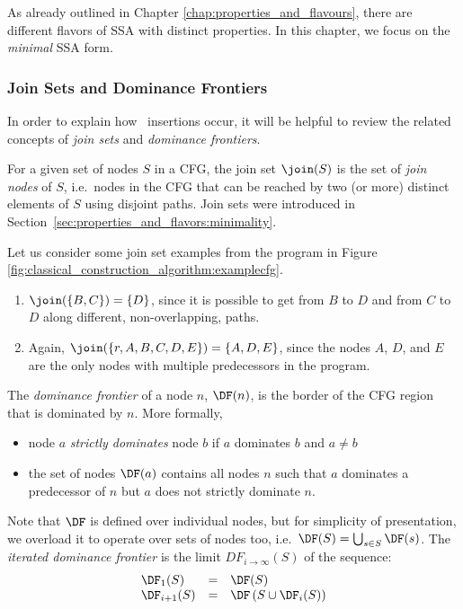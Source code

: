 As already outlined in Chapter \ref{chap:properties_and_flavours},
there are different flavors of SSA with distinct properties.
In this chapter, we focus on the \textit{minimal} SSA form.

\subsubsection*{Join Sets and Dominance Frontiers}

In order to explain how \phifun\ insertions occur,
it will be helpful 
to review the related concepts of \textit{join sets} and
\textit{dominance frontiers}.

For a given set of nodes $S$ in a CFG, the join set $\join(S)$
is the set of \textit{join nodes} of $S$,
i.e.\ nodes in the CFG that can be reached by
two (or more) distinct elements of $S$ using disjoint paths.
Join sets were introduced in
Section~\ref{sec:properties_and_flavors:minimality}.

Let us consider some join set examples from the
program in Figure \ref{fig:classical_construction_algorithm:examplecfg}.
\begin{enumerate}
\item $\join(\{B,C\}) = \{D\}$, since it is possible to get from $B$ to $D$
and from $C$ to $D$ along different, non-overlapping, paths.
\item Again, $\join(\{r, A, B, C, D, E \}) = \{A,D,E\}$, since the nodes
$A$, $D$, and $E$ are the only nodes with multiple predecessors in
the program.
\end{enumerate}


The \textit{dominance frontier} of a node $n$,
$\DF(n)$, is the border of the CFG region that is dominated by $n$.
More formally,
\begin{itemize}
\item node $a$ \textit{strictly dominates} node $b$ if $a$ dominates
  $b$ and $a \neq b$
\item the set of nodes $\DF(a)$ contains all nodes $n$ such that $a$
  dominates a predecessor of $n$ but $a$ does not strictly dominate $n$.
\end{itemize}

Note that $\DF$ is defined over individual nodes, 
but for simplicity of presentation, we overload it to 
operate over sets of nodes too, i.e.\ 
$\DF(S) = \bigcup_{s\in S} \DF(s)$.
The \textit{iterated dominance frontier}
is the limit $DF_{i\rightarrow\infty}(S)$
of the sequence:
$$\begin{array}{lll}
\DF_1(S) & = & \DF(S)\\
\DF_{i+1}(S) & = & \DF\left(S\cup \DF_i(S)\right)
\end{array}$$

